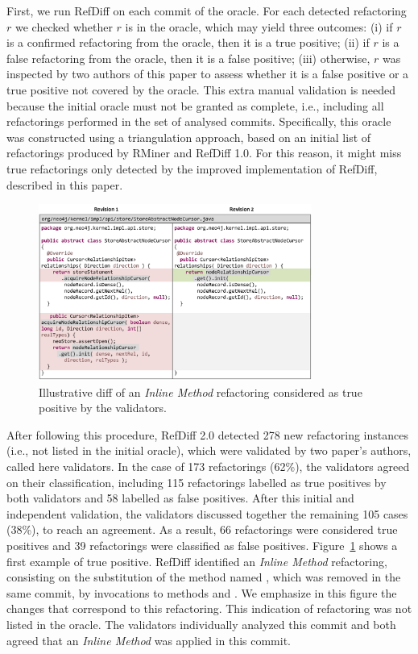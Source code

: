 First, we run RefDiff on each commit of the oracle. For each detected refactoring $r$ we checked whether $r$ is in the oracle, which may yield three outcomes: (i) if $r$ is a confirmed refactoring from the oracle, then it is a true positive; (ii) if $r$ is a false refactoring from the oracle, then it is a false positive; (iii) otherwise, $r$ was inspected by two authors of this paper to assess whether it is a false positive or a true positive not covered by the oracle.
This extra manual validation is needed because the initial oracle must not be granted as complete, i.e., including all refactorings performed in the set of analysed commits.
Specifically, this oracle was constructed using a triangulation approach, based on an initial list of refactorings produced by RMiner and RefDiff 1.0. For this reason, it might miss true refactorings only detected by the improved implementation of RefDiff, described in this paper.

\begin{figure}[!t]
\centering
\includegraphics[width=0.8\textwidth]{img/diff2.pdf}
\caption{Illustrative diff of an \emph{Inline Method} refactoring considered as true positive by the validators.}
\label{FigDiff2}
\end{figure}

After following this procedure, RefDiff 2.0 detected 278 new refactoring instances (i.e., not listed in the initial oracle), which were  validated by two paper's authors, called here validators. In the case of 173 refactorings (62\%), the validators agreed on their classification, including 115 refactorings labelled as true positives by both validators and 58 labelled as false positives. After this initial and independent validation, the validators discussed together the remaining 105 cases (38\%), to reach an agreement. As a result, 66 refactorings were considered true positives and 39 refactorings were classified as false positives. Figure~\ref{FigDiff2} shows a first example of true positive. RefDiff identified an \emph{Inline Method} refactoring, consisting on the substitution of the method named , which was removed in the same commit, by invocations to methods  and . We emphasize in this figure the changes that correspond to this refactoring. This indication of refactoring was not listed in the oracle. The validators individually analyzed this commit and both agreed that an \emph{Inline Method} was applied in this commit.



